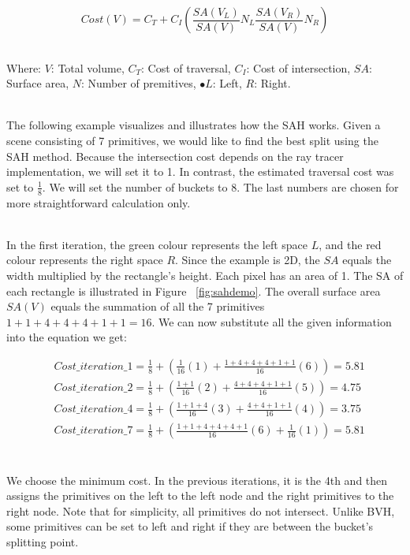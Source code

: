 \documentclass[11pt,a4paper]{article}
\begin{document}
\begin{equation}
Cost(V) = C_T + C_I(\frac{SA(V_L)}{SA(V)}N_L \frac{SA(V_R)}{SA(V)}N_R)
\end{equation}

\noindent
\\
Where: $V$: Total volume, $C_T$: Cost of traversal, $C_I$: Cost of intersection, $SA$: Surface area, $N$: Number of premitives, $•L$: Left, $R$: Right.

\noindent
\\
The following example visualizes and illustrates how the SAH works. Given a scene consisting of 7 primitives, we would like to find the best split using the SAH method. Because the intersection cost depends on the ray tracer implementation, we will set it to 1. In contrast, the estimated traversal cost was set to $\frac{1}{8}$. We will set the number of buckets to 8. The last numbers are chosen for more straightforward calculation only.

\noindent
\\
In the first iteration, the green colour represents the left space $L$, and the red colour represents the right space $R$. Since the example is 2D, the $SA $ equals the width multiplied by the rectangle's height. Each pixel has an area of 1. The SA of each rectangle is illustrated in Figure ~\ref{fig:sahdemo}. The overall surface area $SA(V)$ equals the summation of all the 7 primitives $1+1+4+4+4+1+1 = 16$. We can now substitute all the given information into the equation we get: 


\begin{align*}
& Cost\_iteration\_1 =  \frac{1}{8} + (\frac{1}{16}(1) +\frac{1+4+4+4+1+1}{16}(6)) = 5.81 \\
&Cost\_iteration\_2 =  \frac{1}{8} + (\frac{1+1}{16}(2) +\frac{4+4+4+1+1}{16}(5)) = 4.75 \\
&Cost\_iteration\_4 =  \frac{1}{8} + (\frac{1+1+4}{16}(3) +\frac{4+4+1+1}{16}(4)) = 3.75 \\
&Cost\_iteration\_7 =  \frac{1}{8} + (\frac{1+1+4+4+4+1}{16}(6) +\frac{1}{16}(1)) = 5.81 \\
\end{align*}


\noindent
\\
We choose the minimum cost. In the previous iterations, it is the 4th and then assigns the primitives on the left to the left node and the right primitives to the right node. Note that for simplicity, all primitives do not intersect. Unlike BVH, some primitives can be set to left and right if they are between the bucket's splitting point.
\end{document}
